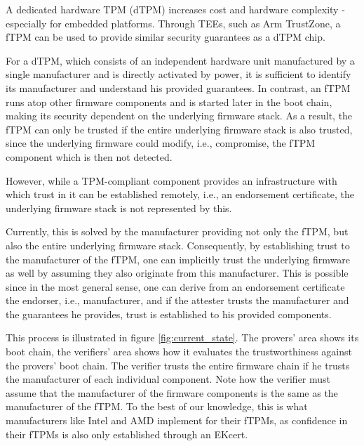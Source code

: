 A dedicated hardware TPM (dTPM) increases cost and hardware complexity - especially for embedded platforms.
Through \acp{TEE}, such as Arm TrustZone, a \ac{fTPM} can be used to provide similar security guarantees as a dTPM chip.


For a dTPM, which consists of an independent hardware unit manufactured by a single manufacturer and is directly activated by power, it is sufficient to identify its manufacturer and understand his provided guarantees.
In contrast, an \ac{fTPM} runs atop other firmware components and is started later in the boot chain, making its security dependent on the underlying firmware stack.
As a result, the fTPM can only be trusted if the entire underlying firmware stack is also trusted, since the underlying firmware could modify, i.e., compromise, the fTPM component which is then not detected.


However, while a TPM-compliant component provides an infrastructure with which trust in it can be established remotely, i.e., an endorsement certificate, the underlying firmware stack is not represented by this.


Currently, this is solved by the manufacturer providing not only the fTPM, but also the entire underlying firmware stack.
Consequently, by establishing trust to the manufacturer of the fTPM, one can implicitly trust the underlying firmware as well by assuming they also originate from this manufacturer.
This is possible since in the most general sense, one can derive from an endorsement certificate the endorser, i.e., manufacturer, and if the attester trusts the manufacturer and the guarantees he provides, trust is established to his provided components.



This process is illustrated in figure \autoref{fig:current_state}. The provers' area shows its boot chain, the verifiers' area shows how it evaluates the trustworthiness against the provers' boot chain. The verifier trusts the entire firmware chain if he trusts the manufacturer of each individual component. Note how the verifier must assume that the manufacturer of the firmware components is the same as the manufacturer of the fTPM. To the best of our knowledge, this is what manufacturers like Intel and AMD implement for their \acp{fTPM}, as confidence in their \acp{fTPM} is also only established through an EKcert.

